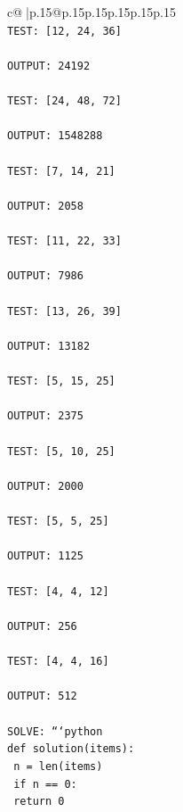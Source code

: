 \documentclass{article}
\begin{document}
{\begin{supertabular}{c@{$\;$}|p{.15\linewidth}@{}p{.15\linewidth}p{.15\linewidth}p{.15\linewidth}p{.15\linewidth}p{.15\linewidth}}
{{{\\ 
\texttt{TEST: {[}12, 24, 36{]}} \\
\\ 
\texttt{OUTPUT: 24192} \\
\\ 
\texttt{TEST: {[}24, 48, 72{]}} \\
\\ 
\texttt{OUTPUT: 1548288} \\
\\ 
\texttt{TEST: {[}7, 14, 21{]}} \\
\\ 
\texttt{OUTPUT: 2058} \\
\\ 
\texttt{TEST: {[}11, 22, 33{]}} \\
\\ 
\texttt{OUTPUT: 7986} \\
\\ 
\texttt{TEST: {[}13, 26, 39{]}} \\
\\ 
\texttt{OUTPUT: 13182} \\
\\ 
\texttt{TEST: {[}5, 15, 25{]}} \\
\\ 
\texttt{OUTPUT: 2375} \\
\\ 
\texttt{TEST: {[}5, 10, 25{]}} \\
\\ 
\texttt{OUTPUT: 2000} \\
\\ 
\texttt{TEST: {[}5, 5, 25{]}} \\
\\ 
\texttt{OUTPUT: 1125} \\
\\ 
\texttt{TEST: {[}4, 4, 12{]}} \\
\\ 
\texttt{OUTPUT: 256} \\
\\ 
\texttt{TEST: {[}4, 4, 16{]}} \\
\\ 
\texttt{OUTPUT: 512} \\
\\ 
\texttt{SOLVE: ```python} \\
\texttt{def solution(items):} \\
\texttt{    n = len(items)} \\
\texttt{    if n == 0:} \\
\texttt{        return 0} \\
}}}
\end{supertabular}}
\end{document}
